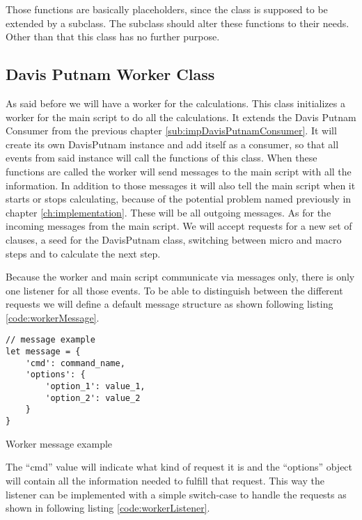 Those functions are basically placeholders, since the class is supposed to be extended by a subclass. The subclass should alter these functions to their needs. Other than that this class has no further purpose.

\subsection{Davis Putnam Worker Class}
\label{sub:impDavisPutnamWorker}
As said before we will have a worker for the calculations. This class initializes a worker for the main script to do all the calculations. It extends the Davis Putnam Consumer from the previous chapter \ref{sub:impDavisPutnamConsumer}. It will create its own DavisPutnam instance and add itself as a consumer, so that all events from said instance will call the functions of this class. When these functions are called the worker will send messages to the main script with all the information. In addition to those messages it will also tell the main script when it starts or stops calculating, because of the potential problem named previously in chapter \ref{ch:implementation}. These will be all outgoing messages. As for the incoming messages from the main script. We will accept requests for a new set of clauses, a seed for the DavisPutnam class, switching between micro and macro steps and to calculate the next step.

Because the worker and main script communicate via messages only, there is only one listener for all those events. To be able to distinguish between the different requests we will define a default message structure as shown following listing \ref{code:workerMessage}.

\begin{listing}[h!]
\begin{verbatim}
// message example
let message = {
    'cmd': command_name,
    'options': {
        'option_1': value_1,
        'option_2': value_2
    }
}
\end{verbatim}
    \caption{Worker message example}
    \label{code:workerMessage}
\end{listing}

The ``cmd'' value will indicate what kind of request it is and the ``options'' object will contain all the information needed to fulfill that request. This way the listener can be implemented with a simple switch-case to handle the requests as shown in following listing \ref{code:workerListener}.

